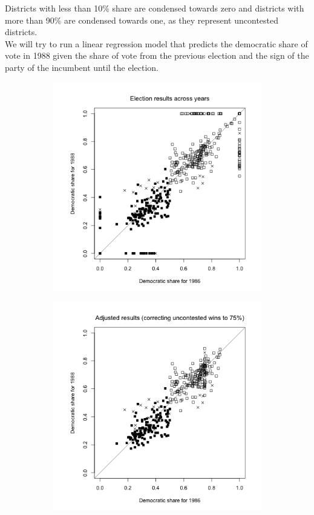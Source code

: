 \documentclass[a4paper, 11pt]{article}
\begin{document}
Districts with less than 10\% share are condensed towards zero and districts with more than 90\% are condensed towards one, as they represent uncontested districts.\\
\newline We will try to run a linear regression model that predicts the democratic share of vote in 1988 given the share of vote from the previous election and the sign of the party of the incumbent until the election.
\begin{figure}[H]
\centering
\begin{subfigure}{.5\textwidth}
  \centering
  \includegraphics[width=1\linewidth]{plot_ex4_2.png}
\end{subfigure}%
\begin{subfigure}{.5\textwidth}
  \centering
  \includegraphics[width=1\linewidth]{plot_ex4_3.png}

\end{subfigure}
\end{figure}
\end{document}
